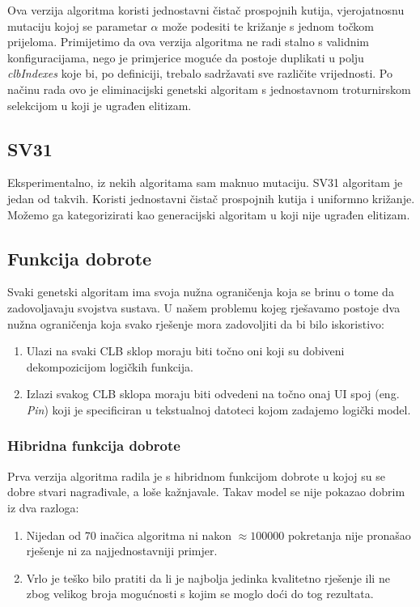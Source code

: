 \documentclass[times, utf8, zavrsni]{fer}
\begin{document}
Ova verzija algoritma koristi jednostavni čistač prospojnih kutija, vjerojatnosnu mutaciju kojoj se parametar $\alpha$ može podesiti te križanje s jednom točkom prijeloma. Primijetimo da ova verzija algoritma ne radi stalno s validnim konfiguracijama, nego je primjerice moguće da postoje duplikati u polju \emph{clbIndexes} koje bi, po definiciji, trebalo sadržavati sve različite vrijednosti. Po načinu rada ovo je eliminacijski genetski algoritam s jednostavnom troturnirskom selekcijom u koji je ugrađen elitizam.  

\subsection{SV31}

Eksperimentalno, iz nekih algoritama sam maknuo mutaciju. SV31 algoritam je jedan od takvih. Koristi jednostavni čistač prospojnih kutija i uniformno križanje.
Možemo ga kategorizirati kao generacijski algoritam u koji nije ugrađen elitizam. 


\subsection{Funkcija dobrote}

Svaki genetski algoritam ima svoja nužna ograničenja koja se brinu o tome da zadovoljavaju svojstva sustava. U našem problemu kojeg rješavamo postoje dva nužna ograničenja koja svako rješenje mora zadovoljiti da bi bilo iskoristivo:

\begin{enumerate}
	\item Ulazi na svaki CLB sklop moraju biti točno oni koji su dobiveni dekompozicijom logičkih funkcija.
 	\item Izlazi svakog CLB sklopa moraju biti odvedeni na točno onaj UI spoj (eng. \emph{Pin}) koji je specificiran u tekstualnoj datoteci kojom zadajemo logički model.
\end{enumerate}

\subsubsection{Hibridna funkcija dobrote}
 
Prva verzija algoritma radila je s hibridnom funkcijom dobrote u kojoj su se dobre stvari nagrađivale, a loše kažnjavale. Takav model se nije pokazao dobrim iz dva razloga:
\begin{enumerate}
	\item Nijedan od 70 inačica algoritma ni nakon $\approx100000$ pokretanja nije pronašao rješenje ni za najjednostavniji primjer.
	\item Vrlo je teško bilo pratiti da li je najbolja jedinka kvalitetno rješenje ili ne zbog velikog broja mogućnosti s kojim se moglo doći do tog rezultata. 
\end{enumerate}
\end{document}
